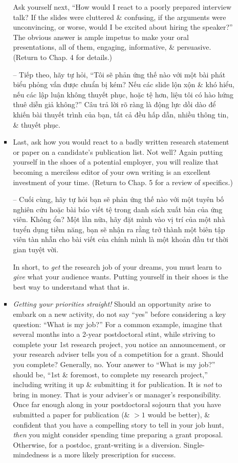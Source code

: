 \documentclass{article}
\begin{document}
\begin{enumerate}
\begin{itemize}
\begin{itemize}
			Ask yourself next, ``How would I react to a poorly prepared interview talk? If the slides were cluttered \& confusing, if the arguments were unconvincing, or worse, would I be excited about hiring the speaker?'' The obvious answer is ample impetus to make your oral presentations, all of them, engaging, informative, \& persuasive. (Return to Chap. 4 for details.)
			
			-- Tiếp theo, hãy tự hỏi, ``Tôi sẽ phản ứng thế nào với một bài phát biểu phỏng vấn được chuẩn bị kém? Nếu các slide lộn xộn \& khó hiểu, nếu các lập luận không thuyết phục, hoặc tệ hơn, liệu tôi có hào hứng thuê diễn giả không?'' Câu trả lời rõ ràng là động lực dồi dào để khiến bài thuyết trình của bạn, tất cả đều hấp dẫn, nhiều thông tin, \& thuyết phục.
			\item Last, ask how you would react to a badly written research statement or paper on a candidate's publication list. Not well? Again putting yourself in the shoes of a potential employer, you will realize that becoming a merciless editor of your own writing is an excellent investment of your time. (Return to Chap. 5 for a review of specifics.)
			
			-- Cuối cùng, hãy tự hỏi bạn sẽ phản ứng thế nào với một tuyên bố nghiên cứu hoặc bài báo viết tệ trong danh sách xuất bản của ứng viên. Không ổn? Một lần nữa, hãy đặt mình vào vị trí của một nhà tuyển dụng tiềm năng, bạn sẽ nhận ra rằng trở thành một biên tập viên tàn nhẫn cho bài viết của chính mình là một khoản đầu tư thời gian tuyệt vời.
			
			In short, to {\it get} the research job of your dreams, you must learn to {\it give} what your audience wants. Putting yourself in their shoes is the best way to understand what that is.
			\item {\it Getting your priorities straight!} Should an opportunity arise to embark on a new activity, do not say ``yes'' before considering a key question: ``What is my job?'' For a common example, imagine that several months into a 2-year postdoctoral stint, while striving to complete your 1st research project, you notice an announcement, or your research adviser tells you of a competition for a grant. Should you complete? Generally, no. Your answer to ``What is my job?'' should be, ``1st \& foremost, to complete my research project,'' including writing it up \& submitting it for publication. It is {\it not} to bring in money. That is your adviser's or manager's responsibility. Once far enough along in your postdoctoral sojourn that you have submitted a paper for publication (\& $> 1$ would be better), \& confident that you have a compelling story to tell in your job hunt, {\it then} you might consider spending time preparing a grant proposal. Otherwise, for a postdoc, grant-writing is a diversion. Single-mindedness is a more likely prescription for success.
			

\end{itemize}
\end{itemize}
\end{enumerate}
\end{document}

